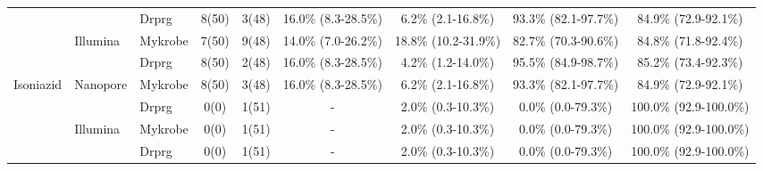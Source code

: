 \begin{table}
{\begin{tabular}{|l|l|l|c|c|c|c|c|c|}
                               &                            & \cellcolor[HTML]{EFEFEF}Drprg & \cellcolor[HTML]{EFEFEF}8(50) & \cellcolor[HTML]{EFEFEF}3(48)  & \cellcolor[HTML]{EFEFEF}16.0\% (8.3-28.5\%)  & \cellcolor[HTML]{EFEFEF}6.2\% (2.1-16.8\%)   & \cellcolor[HTML]{EFEFEF}93.3\% (82.1-97.7\%) & \cellcolor[HTML]{EFEFEF}84.9\% (72.9-92.1\%)   \\ \cline{3-9} 
                               & \multirow{-2}{*}{Illumina} & Mykrobe                       & 7(50)                         & 9(48)                          & 14.0\% (7.0-26.2\%)                          & 18.8\% (10.2-31.9\%)                         & 82.7\% (70.3-90.6\%)                         & 84.8\% (71.8-92.4\%)                           \\ \cline{2-9} 
                               &                            & \cellcolor[HTML]{EFEFEF}Drprg & \cellcolor[HTML]{EFEFEF}8(50) & \cellcolor[HTML]{EFEFEF}2(48)  & \cellcolor[HTML]{EFEFEF}16.0\% (8.3-28.5\%)  & \cellcolor[HTML]{EFEFEF}4.2\% (1.2-14.0\%)   & \cellcolor[HTML]{EFEFEF}95.5\% (84.9-98.7\%) & \cellcolor[HTML]{EFEFEF}85.2\% (73.4-92.3\%)   \\ \cline{3-9} 
\multirow{-4}{*}{Isoniazid}    & \multirow{-2}{*}{Nanopore} & Mykrobe                       & 8(50)                         & 3(48)                          & 16.0\% (8.3-28.5\%)                          & 6.2\% (2.1-16.8\%)                           & 93.3\% (82.1-97.7\%)                         & 84.9\% (72.9-92.1\%)                           \\ \hline
                               &                            & \cellcolor[HTML]{EFEFEF}Drprg & \cellcolor[HTML]{EFEFEF}0(0)  & \cellcolor[HTML]{EFEFEF}1(51)  & \cellcolor[HTML]{EFEFEF}-                    & \cellcolor[HTML]{EFEFEF}2.0\% (0.3-10.3\%)   & \cellcolor[HTML]{EFEFEF}0.0\% (0.0-79.3\%)   & \cellcolor[HTML]{EFEFEF}100.0\% (92.9-100.0\%) \\ \cline{3-9} 
                               & \multirow{-2}{*}{Illumina} & Mykrobe                       & 0(0)                          & 1(51)                          & -                                            & 2.0\% (0.3-10.3\%)                           & 0.0\% (0.0-79.3\%)                           & 100.0\% (92.9-100.0\%)                         \\ \cline{2-9} 
                               &                            & \cellcolor[HTML]{EFEFEF}Drprg & \cellcolor[HTML]{EFEFEF}0(0)  & \cellcolor[HTML]{EFEFEF}1(51)  & \cellcolor[HTML]{EFEFEF}-                    & \cellcolor[HTML]{EFEFEF}2.0\% (0.3-10.3\%)   & \cellcolor[HTML]{EFEFEF}0.0\% (0.0-79.3\%)   & \cellcolor[HTML]{EFEFEF}100.0\% (92.9-100.0\%) \\ \cline{3-9} 

\end{tabular}}
\end{table}
